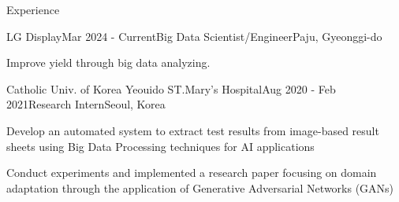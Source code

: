 \documentclass[
	11pt, %
]{resume} %
\begin{document}

\begin{rSection}{Experience}

	\begin{rSubsection}{LG Display}{Mar 2024 - Current}{Big Data Scientist/Engineer}{Paju, Gyeonggi-do}
		\item Improve yield through big data analyzing.
	\end{rSubsection}






	\begin{rSubsection}{Catholic Univ. of Korea Yeouido ST.Mary's Hospital}{Aug 2020 - Feb 2021}{Research Intern}{Seoul, Korea}
		\item Develop an automated system to extract test results from image-based result sheets using Big Data Processing techniques for AI applications
		\item Conduct experiments and implemented a research paper focusing on domain adaptation through the application of Generative Adversarial Networks (GANs)
	\end{rSubsection}


\end{rSection}
\end{document}
